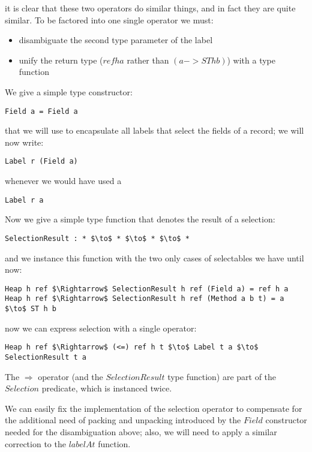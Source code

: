 \documentclass[a4paper]{article}
\begin{document}
it is clear that these two operators do similar things, and in fact they are quite similar. To be factored into one single operator we must:
\begin{itemize}
\item disambiguate the second type parameter of the label
\item unify the return type ($ref h a$ rather than $(a->ST h b)$) with a type function
\end{itemize}

We give a simple type constructor:

\begin{lstlisting}
Field a = Field a
\end{lstlisting}

that we will use to encapsulate all labels that select the fields of a record; we will now write:

\begin{lstlisting}
Label r (Field a)
\end{lstlisting}

whenever we would have used a

\begin{lstlisting}
Label r a
\end{lstlisting}

Now we give a simple type function that denotes the result of a selection:

\begin{lstlisting}
SelectionResult : * $\to$ * $\to$ * $\to$ *
\end{lstlisting}

and we instance this function with the two only cases of selectables we have until now:

\begin{lstlisting}
Heap h ref $\Rightarrow$ SelectionResult h ref (Field a) = ref h a
Heap h ref $\Rightarrow$ SelectionResult h ref (Method a b t) = a $\to$ ST h b
\end{lstlisting}

now we can express selection with a single operator:

\begin{lstlisting}
Heap h ref $\Rightarrow$ (<=) ref h t $\to$ Label t a $\to$ SelectionResult t a
\end{lstlisting}

The $\Rightarrow$ operator (and the $SelectionResult$ type function) are part of the $Selection$ predicate, which is instanced twice.

We can easily fix the implementation of the selection operator to compensate for the additional need of packing and unpacking introduced by the $Field$ constructor needed for the disambiguation above; also, we will need to apply a similar correction to the $labelAt$ function.
\end{document}
